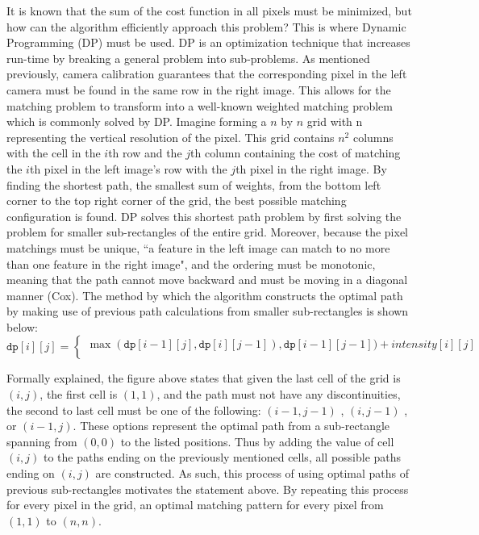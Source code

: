\documentclass[11pt]{scrartcl}
\begin{document}
It is known that the sum of the cost function in all pixels must be minimized, but how can 
the algorithm efficiently approach this problem? This is where Dynamic Programming (DP)
must be used. DP is an optimization technique that increases run-time by breaking a general problem into sub-problems.  As mentioned previously, camera calibration guarantees that the corresponding 
pixel in the left camera must be found in the same row in the right image. This allows for the matching problem to transform into a well-known weighted matching problem which is commonly solved by DP. Imagine forming a $n$ by $n$ grid with n representing the vertical resolution of the pixel. This grid contains $n^2$ columns with the cell in the 
$i$th row and the $j$th column containing the cost of matching the $i$th pixel in the left image's row with the $j$th pixel in the right image. By finding the shortest path, the smallest sum of weights, from the bottom left corner to the top right corner of the grid, the best possible matching configuration is found. DP solves this shortest path problem 
by first solving the problem for smaller sub-rectangles of the entire grid. Moreover, because the pixel matchings must be unique, ``a feature in the left image can match to no more than one feature in the right image", and the ordering must be monotonic, meaning that the path cannot move backward and must be moving in a diagonal manner (Cox). The method by which the algorithm constructs the optimal path by making use of previous path calculations from smaller sub-rectangles is shown below: 
\[
	\texttt{dp}[i][j] =
	\begin{cases}
		\max(\texttt{dp}[i-1][j], \texttt{dp}[i][j-1]), \texttt{dp}[i-1][j-1]) + intensity[i][j] \\
		                                                                                         
	\end{cases}
\]
\begin{remark}
	Formally explained, the figure above states that given the last cell of the grid 
	is $(i,j)$, the first cell is $(1,1)$, and the path must not have any discontinuities, 
	the second to last cell must be one of the following: $(i-1, j-1)$ , $(i, j-1)$ , or 
	$(i-1, j)$. These options represent the optimal path from a sub-rectangle spanning from $(0,0)$
	to the listed positions. Thus by adding the value of cell $(i, j)$ to the paths ending on the previously mentioned cells, all possible paths ending on $(i,j)$ are constructed. As such, this process of using optimal paths of previous sub-rectangles motivates the statement above. By repeating 
	this process for every pixel in the grid, an optimal matching pattern for every pixel from 
	$(1,1)$ to $(n,n)$. 
\end{remark}
\end{document}
